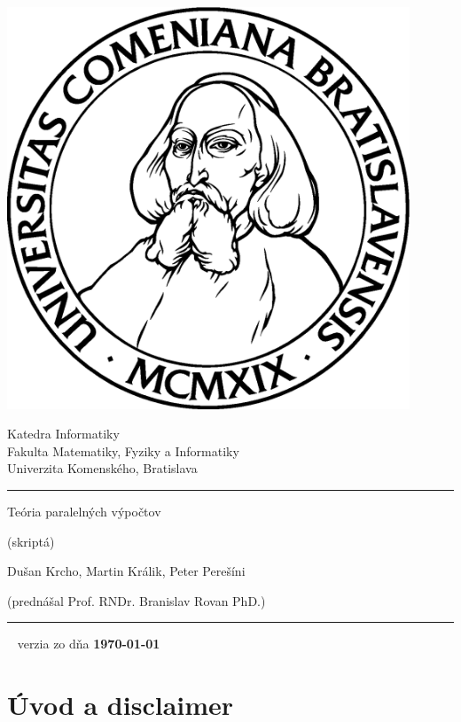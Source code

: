 \documentclass[a4paper]{report}
\title{\mytitle}
\def\mytitle{Teória paralelných výpočtov}
\begin{document}



\thispagestyle{empty}
\begin{minipage}{0.25\textwidth}
\includegraphics[width=0.9\textwidth]{img/komlogo-new}
\end{minipage}
\begin{minipage}{0.69\textwidth}
\begin{center}
\sc Katedra Informatiky \\
Fakulta Matematiky, Fyziky a Informatiky \\
Univerzita Komenského, Bratislava
\end{center}
\end{minipage}

\vfill
\begin{center}
\begin{minipage}{0.8\textwidth}
\hrule
\bigskip\bigskip
\centerline{\LARGE\sc \mytitle}
\smallskip
\centerline{(skriptá)}
\bigskip
\bigskip
\centerline{\large\sc Dušan Krcho, Martin Králik, Peter Perešíni}
\bigskip
\centerline{\large\sc (prednášal Prof. RNDr. Branislav Rovan PhD.)}
\bigskip\bigskip
\hrule
\end{minipage}
\end{center}
\vfill
{~}
\hfill verzia zo dňa {\bf\today} 
\eject %

\section*{Úvod a disclaimer}
\end{document}
